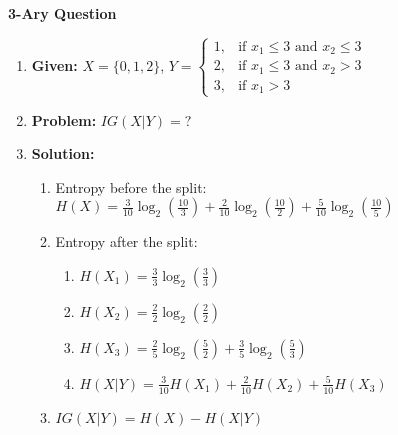 \begin{example} \textbf{3-Ary Question}
    \begin{enumerate}
        \item \textbf{Given:} $X= \{0,1,2\}$, $Y = \begin{cases}
        1, & \text{if } x_1 \leq 3 \text{ and } x_2 \leq 3 \\
        2, & \text{if } x_1 \leq 3 \text{ and } x_2 > 3 \\
        3, & \text{if } x_1 > 3 
        \end{cases}$
        \item \textbf{Problem:} $IG(X|Y) = ?$
        \item \textbf{Solution:}
        \begin{enumerate}
            \item Entropy before the split: $H(X) = \frac{3}{10} \log_2\left(\frac{10}{3}\right) + \frac{2}{10} \log_2\left(\frac{10}{2}\right) + \frac{5}{10} \log_2\left(\frac{10}{5}\right)$
            \item Entropy after the split:
            \begin{enumerate}
                \item $H(X_1) = \frac{3}{3} \log_2\left(\frac{3}{3}\right)$
                \item $H(X_2) = \frac{2}{2} \log_2\left(\frac{2}{2}\right)$
                \item $H(X_3) = \frac{2}{5} \log_2\left(\frac{5}{2}\right) + \frac{3}{5} \log_2\left(\frac{5}{3}\right)$
                \item $H(X|Y) = \frac{3}{10} H(X_1) + \frac{2}{10} H(X_2) + \frac{5}{10} H(X_3)$
            \end{enumerate}
            \item $IG(X|Y) = H(X) - H(X|Y)$
        \end{enumerate}
    \end{enumerate}
\end{example}

